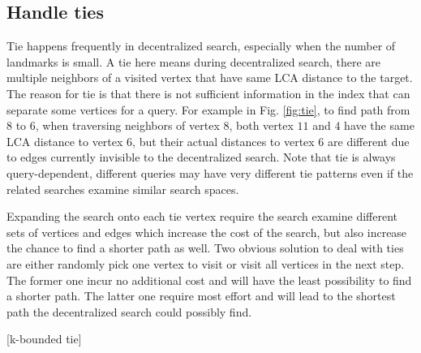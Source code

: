 \subsection{Handle ties}

Tie happens frequently in decentralized search, especially when the number of landmarks is small. A tie here means during decentralized search, there are multiple neighbors of a visited vertex that have same LCA distance to the target. The reason for tie is that there is not sufficient information in the index that can separate some vertices for a query. For example in Fig. \ref{fig:tie}, to find path from $8$ to $6$, when traversing neighbors of vertex $8$, both vertex $11$ and $4$ have the same LCA distance to vertex $6$, but their actual distances to vertex $6$ are different due to edges currently invisible to the decentralized search. Note that tie is always query-dependent, different queries may have very different tie patterns even if the related searches examine similar search spaces. 

Expanding the search onto each tie vertex require the search examine different sets of vertices and edges which increase the cost of the search, but also increase the chance to find a shorter path as well. Two obvious solution to deal with ties are either randomly pick one vertex to visit or visit all vertices in the next step. The former one incur no additional cost and will have the least possibility to find a shorter path. The latter one require most effort and will lead to the shortest path the decentralized search could possibly find.

[k-bounded tie]
